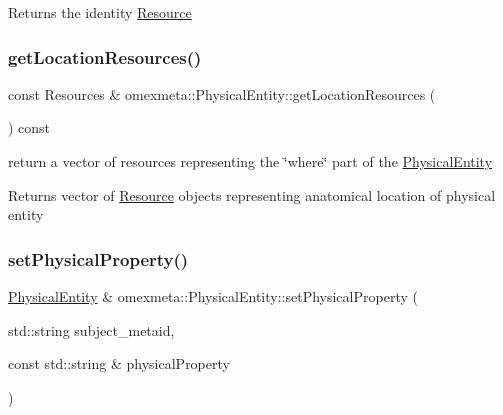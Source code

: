 \begin{DoxyReturn}{Returns}
the identity \hyperlink{classomexmeta_1_1Resource}{Resource} 
\end{DoxyReturn}
\mbox{\label{classomexmeta_1_1PhysicalEntity_a3e2fba07a4622db0180650d24bf263d9}} 
\subsubsection{\texorpdfstring{get\+Location\+Resources()}{getLocationResources()}}
{\footnotesize\ttfamily const Resources \& omexmeta\+::\+Physical\+Entity\+::get\+Location\+Resources (\begin{DoxyParamCaption}{ }\end{DoxyParamCaption}) const}



return a vector of resources representing the \char`\"{}where\char`\"{} part of the \hyperlink{classomexmeta_1_1PhysicalEntity}{Physical\+Entity} 

\begin{DoxyReturn}{Returns}
vector of \hyperlink{classomexmeta_1_1Resource}{Resource} objects representing anatomical location of physical entity 
\end{DoxyReturn}
\mbox{\label{classomexmeta_1_1PhysicalEntity_a5d7168c527d2dbdacd612de37aa9a605}} 
\subsubsection{\texorpdfstring{set\+Physical\+Property()}{setPhysicalProperty()}\hspace{0.1cm}{\footnotesize\ttfamily [1/2]}}
{\footnotesize\ttfamily \hyperlink{classomexmeta_1_1PhysicalEntity}{Physical\+Entity} \& omexmeta\+::\+Physical\+Entity\+::set\+Physical\+Property (\begin{DoxyParamCaption}\item[{std\+::string}]{subject\+\_\+metaid,  }\item[{const std\+::string \&}]{physical\+Property }\end{DoxyParamCaption})}



